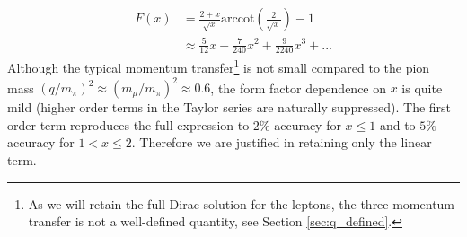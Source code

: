 \documentclass{book}[letterpaper,12pt]
\begin{document}
\begin{equation}
\begin{split}
F(x)&=\frac{2+x}{\sqrt{x}}\mathrm{arccot}\left(\frac{2}{\sqrt{x}}\right)-1\\
&\approx \frac{5}{12}x-\frac{7}{240}x^2+\frac{9}{2240}x^3+...
\end{split}
\end{equation}
Although the typical momentum transfer\footnote{As we will retain the full Dirac solution for the leptons, the three-momentum transfer is not a well-defined quantity, see Section \ref{sec:q_defined}.} is not small compared to the pion mass $(q/m_{\pi})^2\approx (m_{\mu}/m_{\pi})^2\approx 0.6$, the form factor dependence on $x$ is quite mild (higher order terms in the Taylor series are naturally suppressed). The first order term reproduces the full expression to $2\%$ accuracy for $x\leq 1$ and to $5\%$ accuracy for $1<x\leq 2$. Therefore we are justified in retaining only the linear term.
\end{document}
